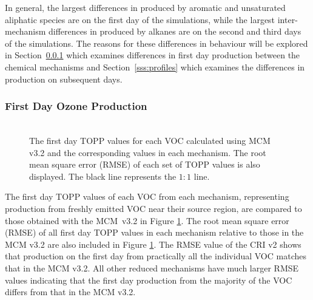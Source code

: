In general, the largest differences in  produced by aromatic and unsaturated aliphatic species are on the first day of the simulations, while the largest inter-mechanism differences in  produced by alkanes are on the second and third days of the simulations.
The reasons for these differences in behaviour will be explored in \mbox{Section \ref{sss:day1}} which examines differences in first day  production between the chemical mechanisms and \mbox{Section \ref{sss:profiles}} which examines the differences in  production on subsequent days.
%
\subsubsection{First Day Ozone Production} \label{sss:day1} %
%
\begin{figure}
    \centering
    \includegraphics[width=\textwidth]{img/first_day_values}
    \vspace{1mm}
    \caption{The first day TOPP values for each VOC calculated using MCM v3.2 and the corresponding values in each mechanism. The root mean square error (RMSE) of each set of TOPP values is also displayed. The black line represents the $1:1$ line.}
    \vspace{-4mm}
    \label{f:first_day}
\end{figure}
%
The first day TOPP values of each VOC from each mechanism, representing  production from freshly emitted VOC near their source region, are compared to those obtained with the \mbox{MCM v3.{2}} in Figure \ref{f:first_day}.
The root mean square error (RMSE) of all first day TOPP values in each mechanism relative to those in the MCM v3.2 are also included in Figure \ref{f:first_day}.  
The RMSE value of the CRI v2 shows that  production on the first day from practically all the individual VOC matches that in the MCM v3.2.
All other reduced mechanisms have much larger RMSE values indicating that the first day  production from the majority of the VOC differs from that in the MCM v3.2.

